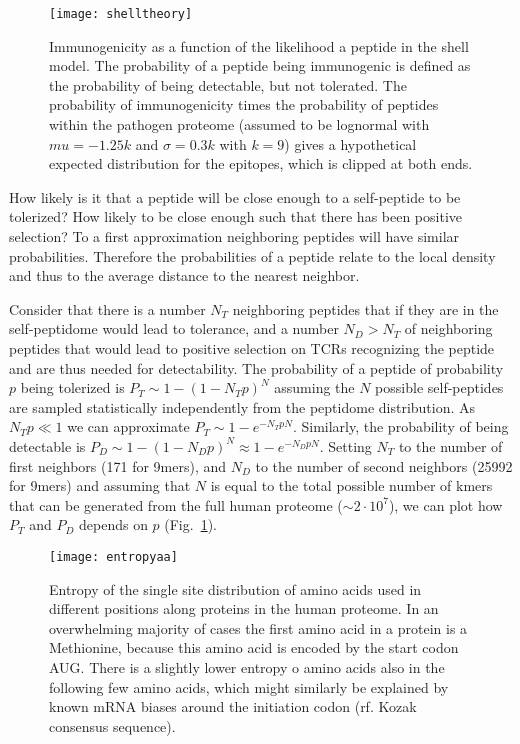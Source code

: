 \documentclass[superscriptaddress,twocolumn,pre]{revtex4}
\newcommand{\<}{\langle}
\renewcommand{\>}{\rangle}
\begin{document}
\begin{figure}
    \texttt{[image: shelltheory]}
    \caption{Immunogenicity as a function of the likelihood a peptide in the shell model. The probability of a peptide being immunogenic is defined as the probability of being detectable, but not tolerated. The probability of immunogenicity times the probability of peptides within the pathogen proteome (assumed to be lognormal with $mu = -1.25 k$ and $\sigma = 0.3 k$ with $k=9$) gives a hypothetical expected distribution for the epitopes, which is clipped at both ends.  
    \label{figshelltheory}
    }
\end{figure}

How likely is it that a peptide will be close enough to a self-peptide to be tolerized? How likely to be close enough such that there has been positive selection? To a first approximation neighboring peptides will have similar probabilities. Therefore the probabilities of a peptide relate to the local density and thus to the average distance to the nearest neighbor.

Consider that there is a number $N_T$ neighboring peptides that if they are in the self-peptidome would lead to tolerance, and a number $N_D > N_T$ of neighboring peptides that would lead to positive selection on TCRs recognizing the peptide and are thus needed for detectability. The probability of a peptide of probability $p$ being tolerized is $P_T \sim 1-(1-N_T p)^N$ assuming the $N$ possible self-peptides are sampled statistically independently from the peptidome distribution. As $N_T p \ll 1$ we can approximate $P_T \sim 1-e^{-N_T p N}$. Similarly, the probability of being detectable is $P_D \sim 1-(1-N_D p)^N \approx 1-e^{-N_D p N}$. Setting $N_T$ to the number of first neighbors (171 for 9mers), and $N_D$ to the number of second neighbors (25992 for 9mers) and assuming that $N$ is equal to the total possible number of kmers that can be generated from the full human proteome ($\sim 2 \cdot 10^7$), we can plot how $P_T$ and $P_D$ depends on $p$ (Fig.~\ref{figshelltheory}).



\begin{figure}
    \texttt{[image: entropyaa]}
    \caption{Entropy of the single site distribution of amino acids used in different positions along proteins in the human proteome. In an overwhelming majority of cases the first amino acid in a protein is a Methionine, because this amino acid is encoded by the start codon AUG. There is a slightly lower entropy o amino acids also in the following few amino acids, which might similarly be explained by known mRNA biases around the initiation codon (rf. Kozak consensus sequence). 
    \label{figentropyaa}
    }
\end{figure}
\end{document}
